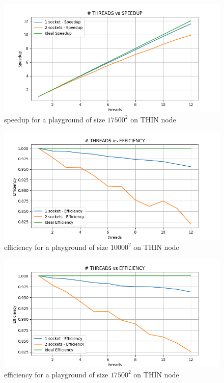 \documentclass[12pt, titlepage]{report}
\begin{document}
\begin{figure}[H]
	\centering
	\includegraphics[width=\textwidth]{Assignment-1/OMP-static-17500-10-THIN-1socketspeedUp.png}
	\caption{speedup for a playground of size $17500^2$ on THIN node}
\end{figure}
\begin{figure}[H]
	\centering
	\includegraphics[width=\textwidth]{Assignment-1/OMP-static-10000-10-THIN-1socketefficiency.png}
	\caption{efficiency for a playground of size $10000^2$ on THIN node}
\end{figure}
\begin{figure}[H]
	\centering
	\includegraphics[width=\textwidth]{Assignment-1/OMP-static-17500-10-THIN-1socketefficiency.png}
	\caption{efficiency for a playground of size $17500^2$ on THIN node}
\end{figure}
\end{document}

